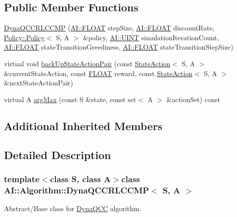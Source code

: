 \subsection*{Public Member Functions}
\begin{DoxyCompactItemize}
\item 
\hyperlink{classAI_1_1Algorithm_1_1DynaQCCRLCCMP_a892dd156f280dd375d7f248258531043}{Dyna\+Q\+C\+C\+R\+L\+C\+C\+M\+P} (\hyperlink{namespaceAI_a41b74884a20833db653dded3918e05c3}{A\+I\+::\+F\+L\+O\+A\+T} step\+Size, \hyperlink{namespaceAI_a41b74884a20833db653dded3918e05c3}{A\+I\+::\+F\+L\+O\+A\+T} discount\+Rate, \hyperlink{classAI_1_1Algorithm_1_1Policy_1_1Policy}{Policy\+::\+Policy}$<$ S, A $>$ \&policy, \hyperlink{namespaceAI_ab6e14dc1e659854858a87e511f1439ec}{A\+I\+::\+U\+I\+N\+T} simulation\+Iteration\+Count, \hyperlink{namespaceAI_a41b74884a20833db653dded3918e05c3}{A\+I\+::\+F\+L\+O\+A\+T} state\+Transition\+Greediness, \hyperlink{namespaceAI_a41b74884a20833db653dded3918e05c3}{A\+I\+::\+F\+L\+O\+A\+T} state\+Transition\+Step\+Size)
\item 
virtual void \hyperlink{classAI_1_1Algorithm_1_1DynaQCCRLCCMP_aebff9b81db5bd2ae33bd3d6662539bc0}{back\+Up\+State\+Action\+Pair} (const \hyperlink{classAI_1_1StateAction}{State\+Action}$<$ S, A $>$ \&current\+State\+Action, const \hyperlink{namespaceAI_a41b74884a20833db653dded3918e05c3}{F\+L\+O\+A\+T} reward, const \hyperlink{classAI_1_1StateAction}{State\+Action}$<$ S, A $>$ \&next\+State\+Action\+Pair)
\item 
virtual A \hyperlink{classAI_1_1Algorithm_1_1DynaQCCRLCCMP_a145fa4fdba2289842a77c9d483a42ef2}{arg\+Max} (const S \&state, const set$<$ A $>$ \&action\+Set) const 
\end{DoxyCompactItemize}
\subsection*{Additional Inherited Members}


\subsection{Detailed Description}
\subsubsection*{template$<$class S, class A$>$class A\+I\+::\+Algorithm\+::\+Dyna\+Q\+C\+C\+R\+L\+C\+C\+M\+P$<$ S, A $>$}

Abstract/\+Base class for \hyperlink{classAI_1_1Algorithm_1_1DynaQCC}{Dyna\+Q\+C\+C} algorithm. 


